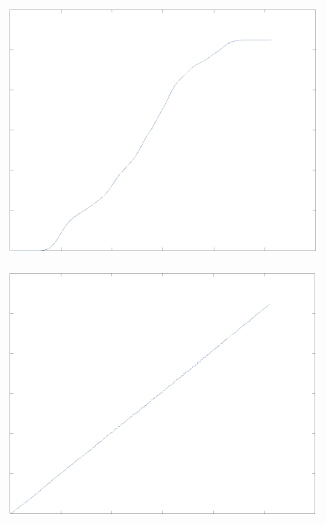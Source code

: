 \documentclass{article}
\begin{document}
\begin{figure}[H]
    \begin{subfigure}{0.5\textwidth}
        \includegraphics[width=0.9\textwidth]{histoAcumLena.png} %
    \end{subfigure}\hfill
    \begin{subfigure}{0.5\textwidth}
        \includegraphics[width=0.9\textwidth]{histoAcumLenaEq.png} %
    \end{subfigure}
\end{figure}
\end{document}
